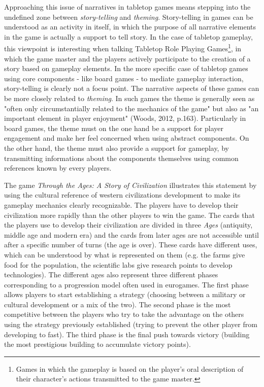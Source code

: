 Approaching this issue of narratives in tabletop games means stepping into the undefined zone between \textit{story-telling} and \textit{theming}. Story-telling in games can be understood as an activity in itself, in which the purpose of all narrative elements in the game is actually a support to tell story. In the case of tabletop gameplay, this viewpoint is interesting when talking Tabletop Role Playing Games\footnote{Games in which the gameplay is based on the player's oral description of their character's actions transmitted to the game master.}, in which the game master and the players actively participate to the creation of a story based on gameplay elements. In the more specific case of tabletop games using core components - like board games - to mediate gameplay interaction, story-telling is clearly not a focus point. The narrative aspects of these games can be more closely related to \textit{theming}. In such games the theme is generally seen as "often only circumstantially related to the mechanics of the game" but also as "an important element in player enjoyment" (Woods, 2012, p.163). Particularly in board games, the theme must on the one hand be a support for player engagement and make her feel concerned when using abstract components. On the other hand, the theme must also provide a support for gameplay, by transmitting informations about the components themselves using common references known by every players.

The game \textit{{Through the Ages: A Story of Civilization}}\cite{game:ages} illustrates this statement by using the cultural reference of western civilizations development to make its gameplay mechanics clearly recognizable. The players have to develop their civilization more rapidly than the other players to win the game. The cards that the players use to develop their civilization are divided in three \textit{Ages} (antiquity, middle age and modern era) and the cards from later ages are not accessible until after a specific number of turns (the age is over). These cards have different uses, which can be understood by what is represented on them (e.g. the farms give food for the population, the scientific labs give research points to develop technologies). The different ages also represent three different phases corresponding to a progression model often used in eurogames. The first phase allows players to start establishing a strategy (choosing between a military or cultural development or a mix of the two). The second phase is the most competitive between the players who try to take the advantage on the others using the strategy previously established (trying to prevent the other player from developing to fast). The third phase is the final push towards victory (building the most prestigious building to accumulate victory points).


